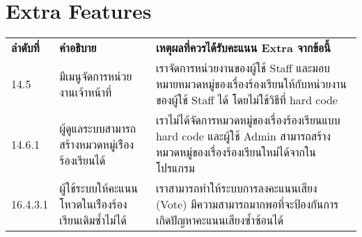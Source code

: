 \section{Extra Features}

\begin{tabularx}{\textwidth}{@{} l l l }
\textbf{ลำดับที่}         & \textbf{คำอธิบาย}                                                             & \textbf{เหตุผลที่ควรได้รับคะแนน Extra จากข้อนี้} \\
14.5                   & \parbox[t]{0.3\textwidth}{มีเมนูจัดการหน่วยงานเจ้าหน้าที่}                           & \parbox[t]{0.5\textwidth}{เราจัดการหน่วยงานของผู้ใช้ Staff และมอบหมายหมวดหมู่ของเรื่องร้องเรียนให้กับหน่วยงานของผู้ใช้ Staff ได้ โดยไม่ใช้วิธีที่ hard code}\\
14.6.1                 & \parbox[t]{0.3\textwidth}{ผู้ดูแลระบบสามารถสร้างหมวดหมู่เร่ืองร้องเรียนได้}             & \parbox[t]{0.5\textwidth}{เราไม่ได้จัดการหมวดหมู่ของเรื่องร้องเรียนแบบ hard code และผู้ใช้ Admin สามารถสร้างหมวดหมู่ของเรื่องร้องเรียนใหม่ได้จากในโปรแกรม}\\
16.4.3.1               & \parbox[t]{0.3\textwidth}{ผู้ใช้ระบบให้คะแนนโหวตในเร่ืองร้องเรียนเดิมซํ้าไม่ได้}          & \parbox[t]{0.5\textwidth}{เราสามารถทำให้ระบบการลงคะแนนเสียง (Vote) มีความสามารถมากพอที่จะป้องกันการเกิดปัญหาคะแนนเสียงซ้ำซ้อนได้}
\end{tabularx}
